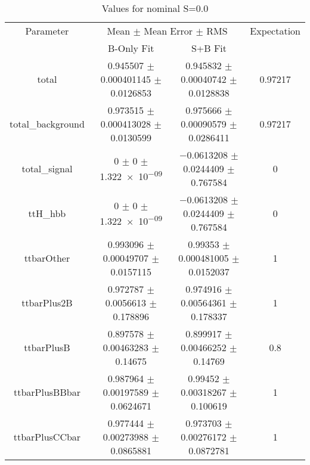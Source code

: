 \begin{table}
\centering
\caption{Values for nominal S=0.0}
\begin{tabular}{cccc}
\toprule
Parameter & \multicolumn{2}{c}{Mean $\pm$ Mean Error $\pm$ RMS} & Expectation\\
 & B-Only Fit & S+B Fit & \\
\midrule
total & \num{0.945507} $\pm$ \num{0.000401145} $\pm$ \num{0.0126853} & \num{0.945832} $\pm$ \num{0.00040742} $\pm$ \num{0.0128838} & \num{0.97217}\\
total\_background & \num{0.973515} $\pm$ \num{0.000413028} $\pm$ \num{0.0130599} & \num{0.975666} $\pm$ \num{0.00090579} $\pm$ \num{0.0286411} & \num{0.97217}\\
total\_signal & \num{0} $\pm$ \num{0} $\pm$ \num{1.322e-09} & \num{-0.0613208} $\pm$ \num{0.0244409} $\pm$ \num{0.767584} & \num{0}\\
ttH\_hbb & \num{0} $\pm$ \num{0} $\pm$ \num{1.322e-09} & \num{-0.0613208} $\pm$ \num{0.0244409} $\pm$ \num{0.767584} & \num{0}\\
ttbarOther & \num{0.993096} $\pm$ \num{0.00049707} $\pm$ \num{0.0157115} & \num{0.99353} $\pm$ \num{0.000481005} $\pm$ \num{0.0152037} & \num{1}\\
ttbarPlus2B & \num{0.972787} $\pm$ \num{0.0056613} $\pm$ \num{0.178896} & \num{0.974916} $\pm$ \num{0.00564361} $\pm$ \num{0.178337} & \num{1}\\
ttbarPlusB & \num{0.897578} $\pm$ \num{0.00463283} $\pm$ \num{0.14675} & \num{0.899917} $\pm$ \num{0.00466252} $\pm$ \num{0.14769} & \num{0.8}\\
ttbarPlusBBbar & \num{0.987964} $\pm$ \num{0.00197589} $\pm$ \num{0.0624671} & \num{0.99452} $\pm$ \num{0.00318267} $\pm$ \num{0.100619} & \num{1}\\
ttbarPlusCCbar & \num{0.977444} $\pm$ \num{0.00273988} $\pm$ \num{0.0865881} & \num{0.973703} $\pm$ \num{0.00276172} $\pm$ \num{0.0872781} & \num{1}\\
\bottomrule
\end{tabular}
\end{table}
